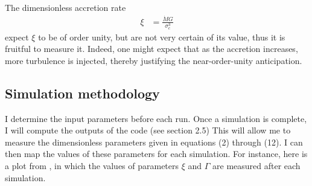 \documentclass[a4paper,12pt]{article}
\begin{document}
The dimensionless accretion rate
\begin{align}
\xi &= \frac{\dot{M}G}{\sigma_c^3}
\end{align} \cite{mat14} expect $\xi$ to be of order unity, but are not very certain of its value, thus it is fruitful to measure it. Indeed, one might expect that as the accretion increases, more turbulence is injected, thereby justifying the near-order-unity anticipation.\\





\subsection{Simulation methodology} 

I determine the input parameters before each run. Once a simulation is complete, I will compute the outputs of the code (see section 2.5) This will allow me to measure the dimensionless parameters given in equations (2) through (12). I can then map the values of these parameters for each simulation. For instance, here is a plot from \cite{kra10}, in which the values of parameters $\xi$ and $\Gamma$ are measured after each simulation.
\end{document}
